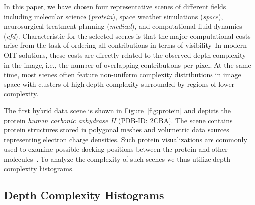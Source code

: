 \documentclass{egpubl}
\newcommand{\green}[1]{{\color{PineGreen}#1}}
\newcommand{\new}[1]{\green{#1}}
\newcommand{\dch}{DCH}
\begin{document}
In this paper, we have chosen four representative scenes of different fields including molecular science (\emph{protein}), space weather simulations (\emph{space}), neurosurgical treatment planning (\emph{medical}), and computational fluid dynamics (\emph{cfd}). 
Characteristic for the selected scenes is that the major computational costs arise from the task of ordering all contributions in terms of visibility. 
In modern OIT solutions, these costs are directly related to the observed depth complexity in the image, i.e., the number of overlapping contributions per pixel. 
At the same time, most scenes often feature non-uniform complexity distributions in image space with clusters of high depth complexity surrounded by regions of lower complexity. 

%
\new{
The first hybrid data scene is shown in Figure~\ref{fig:protein} and depicts the protein \emph{human carbonic anhydrase II} (PDB-ID: 2CBA). 
The scene contains protein structures stored in polygonal meshes and volumetric data sources representing electron charge densities. 
Such protein visualizations are commonly used to examine possible docking positions between the protein and other molecules~\cite{Seeliger2010}. 
%
To analyze the complexity of such scenes we thus utilize depth complexity histograms.
} 

\subsection{Depth Complexity Histograms}
\label{sec:dch}
   
\end{document}
